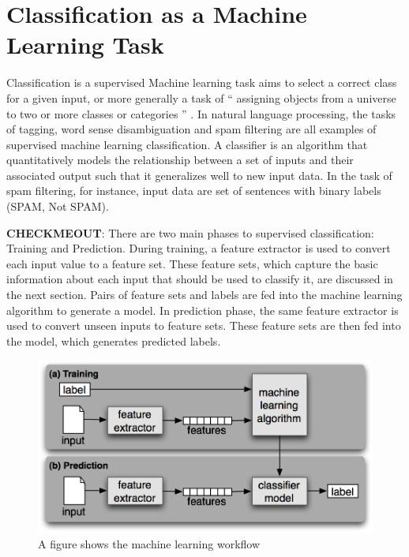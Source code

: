 \section{Classification as a Machine Learning Task}
Classification is a supervised Machine learning task aims to select a correct class for a given input, or more generally a task of “ assigning objects from a universe to two or more classes or categories ” \citep{manning1999foundations}. In natural language processing, the tasks of tagging, word sense disambiguation and spam filtering are all examples of supervised machine learning classification. A classifier is an algorithm that quantitatively models the relationship between a set of inputs and their associated output such that it generalizes well to new input data. In the task of spam filtering, for instance, input data are set of sentences with binary labels (SPAM, Not SPAM). 

\textbf{CHECKMEOUT}: There are two main phases to supervised classification: Training and Prediction. During training, a feature extractor is used to convert each input value to a feature set. These feature sets, which capture the basic information about each input that should be used to classify it, are discussed in the next section. Pairs of feature sets and labels are fed into the machine learning algorithm to generate a model. In prediction phase, the same feature extractor is used to convert unseen inputs to feature sets. These feature sets are then fed into the model, which generates predicted labels.

\begin{figure}
\includegraphics[scale=.8]{../Figures/mlpipeline.png} \centering
\caption{A figure shows the machine learning workflow}
\end{figure}

